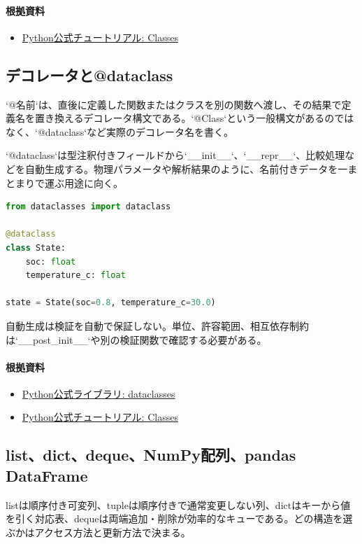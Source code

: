 \documentclass[a4paper,11pt]{article}
\begin{document}
\paragraph{根拠資料}
\begin{itemize}[leftmargin=1.6em]
\item \href{https://docs.python.org/3/tutorial/classes.html}{Python公式チュートリアル: Classes}
\end{itemize}

\subsection{デコレータと@dataclass}
`@名前`は、直後に定義した関数またはクラスを別の関数へ渡し、その結果で定義名を置き換えるデコレータ構文である。`@Class`という一般構文があるのではなく、`@dataclass`など実際のデコレータ名を書く。


`@dataclass`は型注釈付きフィールドから`\_\_init\_\_`、`\_\_repr\_\_`、比較処理などを自動生成する。物理パラメータや解析結果のように、名前付きデータを一まとまりで運ぶ用途に向く。


\begin{lstlisting}[language=python]
from dataclasses import dataclass

@dataclass
class State:
    soc: float
    temperature_c: float

state = State(soc=0.8, temperature_c=30.0)
\end{lstlisting}


自動生成は検証を自動で保証しない。単位、許容範囲、相互依存制約は`\_\_post\_init\_\_`や別の検証関数で確認する必要がある。

\paragraph{根拠資料}
\begin{itemize}[leftmargin=1.6em]
\item \href{https://docs.python.org/3/library/dataclasses.html}{Python公式ライブラリ: dataclasses}
\item \href{https://docs.python.org/3/tutorial/classes.html}{Python公式チュートリアル: Classes}
\end{itemize}

\subsection{list、dict、deque、NumPy配列、pandas DataFrame}
listは順序付き可変列、tupleは順序付きで通常変更しない列、dictはキーから値を引く対応表、dequeは両端追加・削除が効率的なキューである。どの構造を選ぶかはアクセス方法と更新方法で決まる。
\end{document}
